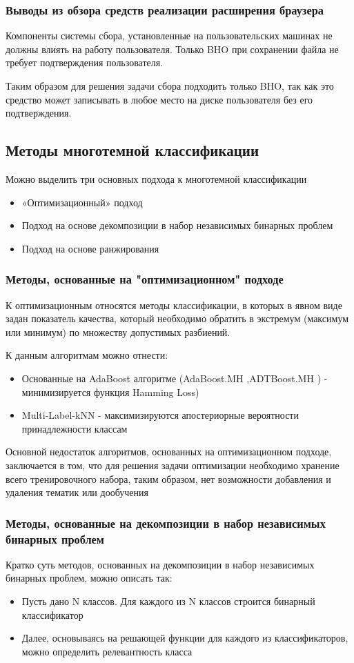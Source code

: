 \documentclass[russian, utf8, emptystyle]{eskdtext}
\begin{document}
\subsubsection{Выводы из обзора средств реализации расширения браузера}

Компоненты системы сбора, установленные на пользовательских машинах не должны влиять на работу пользователя. Только BHO при сохранении файла не требует подтверждения пользователя. 

Таким образом для решения задачи сбора подходить только BHO, так как это средство может записывать в любое место на диске пользователя без его подтверждения.
\subsection{Методы многотемной классификации}
Можно выделить три основных подхода к многотемной классификации \cite{dis}
\begin{itemize}
	\item «Оптимизационный» подход 
	\item Подход на основе декомпозиции в набор независимых бинарных проблем 
	\item Подход на основе ранжирования
\end{itemize}
	\subsubsection{Методы, основанные на "оптимизационном"  подходе}
	К оптимизационным относятся методы классификации, в которых в явном виде задан показатель качества, который необходимо обратить в экстремум (максимум или минимум) по множеству допустимых разбиений.

	К данным алгоритмам можно отнести:
	\begin{itemize}
		\item Основанные на AdaBoost алгоритме (AdaBoost.MH \cite{AdaBoost},ADTBoost.MH \cite{ADT}) - минимизируется функция Hamming Loss)
		\item Multi-Label-kNN - \cite{kNN} максимизируются апостериорные вероятности принадлежности классам
	\end{itemize}

	Основной недостаток алгоритмов, основанных на оптимизационном подходе, заключается в том, что для решения задачи оптимизации необходимо хранение всего тренировочного набора, таким образом, нет возможности добавления и удаления тематик или дообучения
	\subsubsection{Методы, основанные на декомпозиции в набор независимых бинарных проблем}
	Кратко суть методов, основанных на декомпозиции в набор независимых бинарных проблем, можно описать так:
	\begin{itemize}
		\item Пусть дано N классов. Для каждого из N классов строится бинарный классификатор
		\item Далее, основываясь на решающей функции для каждого из классификаторов, можно определить релевантность класса
	\end{itemize}
	
\end{document}
